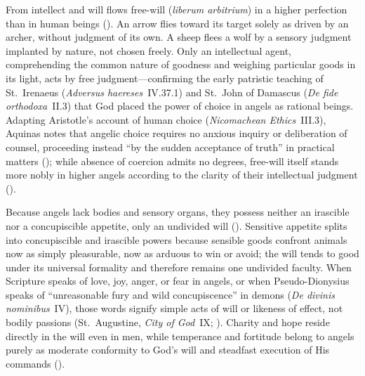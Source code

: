 From intellect and will flows free-will (\emph{liberum arbitrium}) in a higher perfection than in human beings (). An arrow flies toward its target solely as driven by an archer, without judgment of its own. A sheep flees a wolf by a sensory judgment implanted by nature, not chosen freely. Only an intellectual agent, comprehending the common nature of goodness and weighing particular goods in its light, acts by free judgment---confirming the early patristic teaching of St.~Irenaeus (\emph{Adversus haereses}~IV.37.1) and St.~John of Damascus (\emph{De fide orthodoxa}~II.3) that God placed the power of choice in angels as rational beings. Adapting Aristotle's account of human choice (\emph{Nicomachean Ethics}~III.3), Aquinas notes that angelic choice requires no anxious inquiry or deliberation of counsel, proceeding instead ``by the sudden acceptance of truth'' in practical matters (); while absence of coercion admits no degrees, free-will itself stands more nobly in higher angels according to the clarity of their intellectual judgment ().

Because angels lack bodies and sensory organs, they possess neither an irascible nor a concupiscible appetite, only an undivided will (). Sensitive appetite splits into concupiscible and irascible powers because sensible goods confront animals now as simply pleasurable, now as arduous to win or avoid; the will tends to good under its universal formality and therefore remains one undivided faculty. When Scripture speaks of love, joy, anger, or fear in angels, or when Pseudo-Dionysius speaks of ``unreasonable fury and wild concupiscence'' in demons (\emph{De divinis nominibus}~IV), those words signify simple acts of will or likeness of effect, not bodily passions (St.~Augustine, \emph{City of God}~IX; ). Charity and hope reside directly in the will even in men, while temperance and fortitude belong to angels purely as moderate conformity to God's will and steadfast execution of His commands ().


